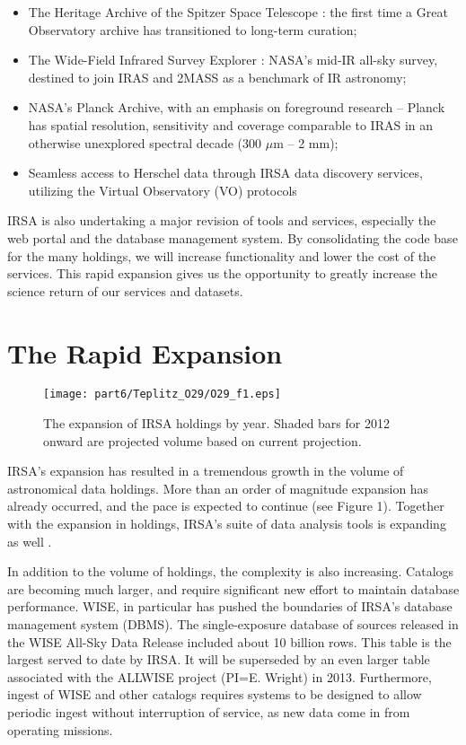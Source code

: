 \begin{itemize}

\item The Heritage Archive of the Spitzer Space Telescope \citep[SHA][]{werner04}: the first time a
  Great Observatory archive has transitioned to long-term curation; 
\item The Wide-Field Infrared Survey Explorer \citep[WISE][]{wright10}: NASA’s mid-IR all-sky survey, destined to
  join IRAS and 2MASS as a benchmark of IR astronomy; 
\item NASA's Planck Archive, with an emphasis on foreground research
  -- Planck \citet{planck11} has spatial resolution, sensitivity and coverage
  comparable to IRAS in an otherwise unexplored spectral decade (300
  $\mu$m – 2 mm); 
\item Seamless access to Herschel data through IRSA data discovery
  services, utilizing the Virtual Observatory (VO) protocols

\end{itemize}

IRSA is also undertaking a
major revision of tools and services, especially the web portal and
the database management system. By consolidating the code base for the
many holdings, we will increase functionality and lower the cost of
the services. This rapid expansion gives us the opportunity to greatly
increase the science return of our services and datasets.

\section{The Rapid Expansion}

\begin{figure}[t]

\centering
\texttt{[image: part6/Teplitz\_O29/O29\_f1.eps]}
\caption{The expansion of IRSA holdings by year.  Shaded  bars for
  2012 onward are projected volume based on current projection.}

\end{figure}


IRSA's expansion has resulted in a tremendous growth in the volume of
astronomical data holdings.  More than an order of magnitude expansion
has already occurred, and the pace is expected to continue (see Figure
1).  Together with the expansion in holdings, IRSA's suite of data analysis
tools is expanding as well \citep{teplitz12}.

In addition to the volume of holdings, the complexity is also
increasing.  Catalogs are becoming much larger, and require
significant new effort to maintain database performance.  WISE, in
particular has pushed the boundaries of IRSA's database management
system (DBMS).  The single-exposure database of sources released in
the WISE All-Sky Data Release included about 10 billion
rows.  This table is the largest served to date by IRSA. It will be
superseded by an even larger table associated with the ALLWISE project
(PI=E. Wright) in 2013.  Furthermore, ingest of WISE and other catalogs requires systems to be
designed to allow periodic ingest without interruption of service, as
new data come in from operating missions.  

